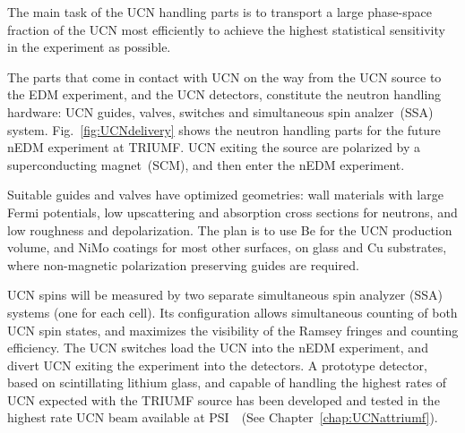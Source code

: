 The main task of the UCN handling parts is to transport a large
phase-space fraction of the UCN most efficiently to achieve the
highest statistical sensitivity in the experiment as possible.

The parts that come in contact with UCN on the way from the UCN source
to the EDM experiment, and the UCN detectors, constitute the neutron
handling hardware: UCN guides, valves, switches and simultaneous spin
analzer~(SSA) system. Fig.~\ref{fig:UCNdelivery} shows the neutron
handling parts for the future nEDM experiment at TRIUMF.  UCN exiting
the source are polarized by a superconducting magnet~(SCM), and then
enter the nEDM experiment.

Suitable guides and valves have optimized geometries: wall materials
with large Fermi potentials, low upscattering and absorption cross
sections for neutrons, and low roughness and depolarization. The plan is
to use Be for the UCN production volume, and NiMo coatings for most
other surfaces, on glass and Cu substrates, where non-magnetic
polarization preserving guides are required.  

UCN spins will be measured by two separate simultaneous spin analyzer
(SSA) systems (one for each cell). Its configuration allows
simultaneous counting of both UCN spin states, and maximizes the
visibility of the Ramsey fringes and counting efficiency.  The UCN
switches load the UCN into the nEDM experiment, and divert UCN exiting
the experiment into the detectors.  A prototype detector, based on
scintillating lithium glass, and capable of handling the highest rates
of UCN expected with the TRIUMF source has been developed and tested
in the highest rate UCN beam available at
PSI~\cite{jamieson2017characterization}~(See
Chapter~\ref{chap:UCNattriumf}).




